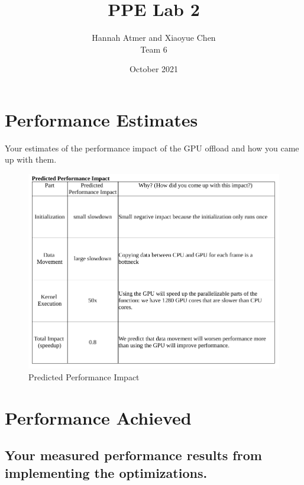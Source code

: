 \documentclass{article}
\title{PPE Lab 2}
\author{Hannah Atmer and Xiaoyue Chen \\ Team 6}
\date{October 2021}
\begin{document}
\maketitle

\section{Performance Estimates}
Your estimates of the performance impact of the GPU offload and how you came up with them. 

\begin{figure}[h!t]
    \centering
    \includegraphics[width=1\textwidth]{predicted.png}
    \caption{Predicted Performance Impact}
    \label{fig:predicted}
\end{figure}

\section{Performance Achieved}

\subsection{Your measured performance results from implementing the optimizations.}
\end{document}
